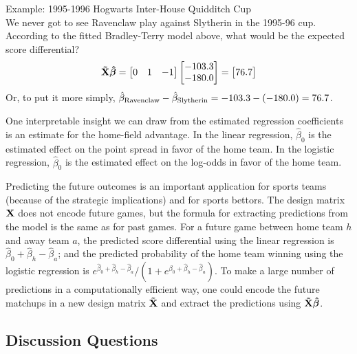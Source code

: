 \documentclass{article}
\begin{document}
  \begin{framed}
    {\sc Example:} 1995-1996 Hogwarts Inter-House Quidditch Cup\\
    We never got to see Ravenclaw play against Slytherin in the 1995-96 cup. According to the fitted Bradley-Terry model above, what would be the expected score differential?
    $$
      {\bf\tilde X}\boldsymbol{\hat\beta} =
      \begin{bmatrix*}[r] 0 &  1 & -1\end{bmatrix*}
      \begin{bmatrix*}[r] -103.3 \\ -180.0 \end{bmatrix*} =
      \begin{bmatrix*}[r] 76.7 \end{bmatrix*}
    $$
    Or, to put it more simply, $\hat\beta_{\mbox{\scriptsize Ravenclaw}} - \hat\beta_{\mbox{\scriptsize Slytherin}} = -103.3 - (-180.0) = 76.7$.
  \end{framed}

  One interpretable insight we can draw from the estimated regression coefficients is an estimate for the home-field advantage. In the linear regression, $\hat\beta_0$ is the estimated effect on the point spread in favor of the home team. In the logistic regression, $\hat\beta_0$ is the estimated effect on the log-odds in favor of the home team.

  Predicting the future outcomes is an important application for sports teams (because of the strategic implications) and for sports bettors. The design matrix $\bf X$ does not encode future games, but the formula for extracting predictions from the model is the same as for past games. For a future game between home team $h$ and away team $a$, the predicted score differential using the linear regression is $\hat\beta_0 + \hat\beta_h - \hat\beta_a$; and the predicted probability of the home team winning using the logistic regression is $e^{\hat\beta_0 + \hat\beta_h - \hat\beta_a} / (1 + e^{\hat\beta_0 + \hat\beta_h - \hat\beta_a})$. To make a large number of predictions in a computationally efficient way, one could encode the future matchups in a new design matrix $\bf \tilde X$ and extract the predictions using $\bf \tilde X \boldsymbol{\hat\beta}$.

  \subsection{\sc Discussion Questions}
\end{document}
